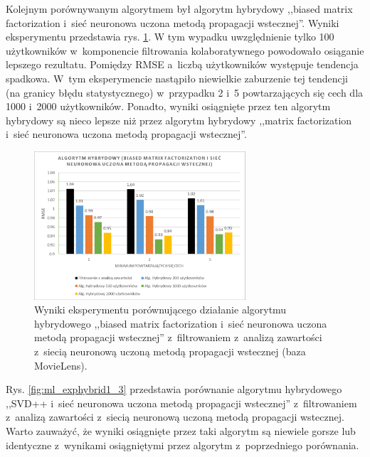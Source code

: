 \documentclass[twoside]{iisthesis}
\begin{document}
		Kolejnym porównywanym algorytmem był algorytm hybrydowy ,,biased matrix factorization i~sieć neuronowa uczona metodą propagacji wstecznej''. Wyniki eksperymentu przedstawia rys. \ref{fig:ml_exphybrid1_2}. 
		W tym wypadku uwzględnienie tylko 100 użytkowników w~komponencie filtrowania kolaboratywnego powodowało osiąganie lepszego rezultatu. Pomiędzy RMSE a~liczbą użytkowników występuje tendencja spadkowa. W~tym eksperymencie nastąpiło niewielkie zaburzenie tej tendencji (na granicy błędu statystycznego) w~przypadku 2 i~5 powtarzających się cech dla 1000 i~2000 użytkowników. Ponadto, wyniki osiągnięte przez ten algorytm hybrydowy są nieco lepsze niż przez algorytm hybrydowy ,,matrix factorization i~sieć neuronowa uczona metodą propagacji wstecznej''.
	
		\begin{figure}
			\centering
			\includegraphics[width=0.7\textwidth]{ml_exphybrid1_2}			
			\caption{Wyniki eksperymentu porównującego działanie algorytmu hybrydowego ,,biased matrix factorization i~sieć neuronowa uczona metodą propagacji wstecznej'' z~filtrowaniem z~analizą zawartości z~siecią neuronową uczoną metodą propagacji wstecznej (baza MovieLens).}
			\label{fig:ml_exphybrid1_2}
		\end{figure}
		
		Rys. \ref{fig:ml_exphybrid1_3} przedstawia porównanie algorytmu hybrydowego ,,SVD++ i~sieć neuronowa uczona metodą propagacji wstecznej'' z~filtrowaniem z~analizą zawartości z~siecią neuronową uczoną metodą propagacji wstecznej. Warto zauważyć, że wyniki osiągnięte przez taki algorytm są niewiele gorsze lub identyczne z~wynikami osiągniętymi przez algorytm z~poprzedniego porównania. 
\end{document}
